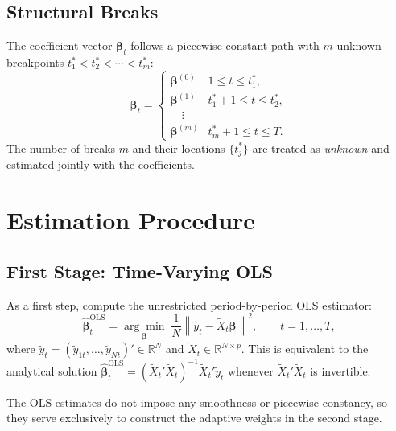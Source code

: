 \documentclass[12pt, a4paper]{article}
\theoremstyle{plain}
\theoremstyle{definition}
\theoremstyle{remark}
\newcommand{\R}{\mathbb{R}}
\newcommand{\bbeta}{\bm{\beta}}
\newcommand{\norm}[1]{\left\| #1 \right\|}
\begin{document}
\begin{onehalfspacing}
\subsection{Structural Breaks}
\label{sub:breaks}

The coefficient vector $\bbeta_t$ follows a piecewise-constant path with
$m$ unknown breakpoints $t_1^* < t_2^* < \cdots < t_m^*$:
\begin{equation}
  \label{eq:breaks}
  \bbeta_t =
  \begin{cases}
    \bbeta^{(0)} & 1 \le t \le t_1^*, \\
    \bbeta^{(1)} & t_1^*+1 \le t \le t_2^*, \\
    \quad \vdots \\
    \bbeta^{(m)} & t_m^*+1 \le t \le T.
  \end{cases}
\end{equation}
The number of breaks $m$ and their locations $\{t_j^*\}$ are treated as
\emph{unknown} and estimated jointly with the coefficients.

\section{Estimation Procedure}
\label{sec:estimation}

\subsection{First Stage: Time-Varying OLS}
\label{sub:ols}

As a first step, compute the unrestricted period-by-period OLS estimator:
\begin{equation}
  \label{eq:ols}
  \hat{\bbeta}_t^{\text{OLS}} =
    \underset{\bbeta}{\arg\min}\;
    \frac{1}{N} \norm{\tilde{y}_t - \tilde{X}_t \bbeta}^2,
    \qquad t = 1,\ldots,T,
\end{equation}
where $\tilde{y}_t = (\tilde{y}_{1t},\ldots,\tilde{y}_{Nt})' \in \R^N$ and
$\tilde{X}_t \in \R^{N \times p}$.  This is equivalent to the analytical
solution $\hat{\bbeta}_t^{\text{OLS}} = (\tilde{X}_t'\tilde{X}_t)^{-1}\tilde{X}_t'\tilde{y}_t$
whenever $\tilde{X}_t'\tilde{X}_t$ is invertible.

The OLS estimates do not impose any smoothness or piecewise-constancy, so
they serve exclusively to construct the adaptive weights in the second stage.


\end{onehalfspacing}
\end{document}
